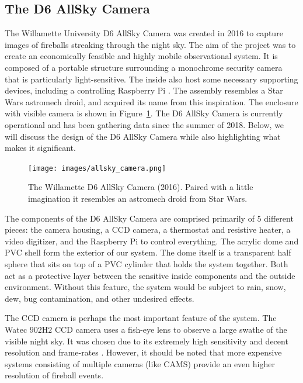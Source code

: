

\subsection{The D6 AllSky Camera}

The Willamette University D6 AllSky Camera was created in 2016 to capture images of fireballs streaking through the night sky.
The aim of the project was to create an economically feasible and highly mobile observational system.
It is composed of a portable structure surrounding a monochrome security camera that is particularly light-sensitive.
The inside also host some necessary supporting devices, including a controlling Raspberry Pi \cite{mcswain_using_2016}.
The assembly resembles a Star Wars astromech droid, and acquired its name from this inspiration.
The enclosure with visible camera is shown in Figure~\ref{droid}.
The D6 AllSky Camera is currently operational and has been gathering data since the summer of 2018.  
Below, we will discuss the design of the D6 AllSky Camera while also highlighting what makes it significant.

\begin{figure}[ht!]
  \centering
  \texttt{[image: images/allsky\_camera.png]}
  \caption{The Willamette D6 AllSky Camera (2016). Paired with a little imagination it resembles an astromech droid from Star Wars.}
  \label{droid}
\end{figure}


The components of the D6 AllSky Camera are comprised primarily of 5 different pieces: the camera housing, a CCD camera, a thermostat and resistive heater, a video digitizer, and the Raspberry Pi to control everything.
The acrylic dome and PVC shell form the exterior of our system. 
The dome itself is a transparent half sphere that sits on top of a PVC cylinder that holds the system together.
Both act as a protective layer between the sensitive inside components and the outside environment.  
Without this feature, the system would be subject to rain, snow, dew, bug contamination, and other undesired effects.

The CCD camera is perhaps the most important feature of the system.
The Watec $902$H$2$ CCD camera uses a fish-eye lens to observe a large swathe of the visible night sky.
It was chosen due to its extremely high sensitivity and decent resolution and frame-rates \cite{noauthor_wat-902h2_nodate}.
However, it should be noted that more expensive systems consisting of multiple cameras (like CAMS) provide an even higher resolution of fireball events.

